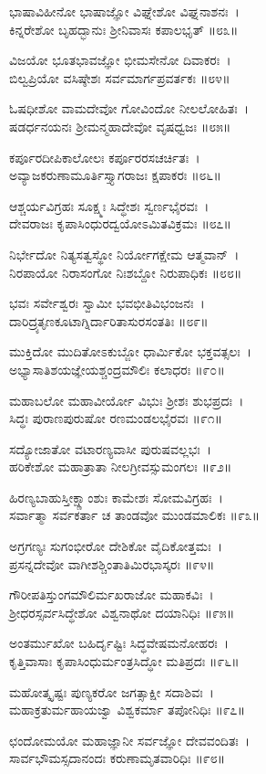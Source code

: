 	ಭಾಷಾವಿಹೀನೋ ಭಾಷಾಜ್ಞೋ ವಿಘ್ನೇಶೋ ವಿಘ್ನನಾಶನಃ~।\\
	ಕಿನ್ನರೇಶೋ ಬೃಹದ್ಭಾನುಃ ಶ್ರೀನಿವಾಸಃ ಕಪಾಲಭೃತ್ ॥೮೩॥

ವಿಜಯೋ ಭೂತಭಾವಜ್ಞೋ ಭೀಮಸೇನೋ ದಿವಾಕರಃ~।\\
ಬಿಲ್ವಪ್ರಿಯೋ ವಸಿಷ್ಠೇಶಃ ಸರ್ವಮಾರ್ಗಪ್ರವರ್ತಕಃ ॥೮೪॥

	ಓಷಧೀಶೋ ವಾಮದೇವೋ ಗೋವಿಂದೋ ನೀಲಲೋಹಿತಃ~।\\
	ಷಡರ್ಧನಯನಃ ಶ್ರೀಮನ್ಮಹಾದೇವೋ ವೃಷಧ್ವಜಃ ॥೮೫॥

ಕರ್ಪೂರದೀಪಿಕಾಲೋಲಃ ಕರ್ಪೂರರಸಚರ್ಚಿತಃ~।\\
ಅವ್ಯಾಜಕರುಣಾಮೂರ್ತಿಸ್ತ್ಯಾಗರಾಜಃ ಕ್ಷಪಾಕರಃ ॥೮೬॥

	ಆಶ್ಚರ್ಯವಿಗ್ರಹಃ ಸೂಕ್ಷ್ಮಃ ಸಿದ್ಧೇಶಃ ಸ್ವರ್ಣಭೈರವಃ~।\\
	ದೇವರಾಜಃ ಕೃಪಾಸಿಂಧುರದ್ವಯೋಽಮಿತವಿಕ್ರಮಃ ॥೮೭॥

ನಿರ್ಭೇದೋ ನಿತ್ಯಸತ್ವಸ್ಥೋ ನಿರ್ಯೋಗಕ್ಷೇಮ ಆತ್ಮವಾನ್~।\\
ನಿರಪಾಯೋ ನಿರಾಸಂಗೋ ನಿಃಶಬ್ದೋ ನಿರುಪಾಧಿಕಃ ॥೮೮॥

	ಭವಃ ಸರ್ವೇಶ್ವರಃ ಸ್ವಾಮೀ ಭವಭೀತಿವಿಭಂಜನಃ~।\\
	ದಾರಿದ್ರ್ಯತೃಣಕೂಟಾಗ್ನಿರ್ದಾರಿತಾಸುರಸಂತತಿಃ ॥೮೯॥

ಮುಕ್ತಿದೋ ಮುದಿತೋಽಕುಬ್ಜೋ ಧಾರ್ಮಿಕೋ ಭಕ್ತವತ್ಸಲಃ~।\\
ಅಭ್ಯಾಸಾತಿಶಯಜ್ಞೇಯಶ್ಚಂದ್ರಮೌಲಿಃ ಕಲಾಧರಃ ॥೯೦॥

	ಮಹಾಬಲೋ ಮಹಾವೀರ್ಯೋ ವಿಭುಃ ಶ್ರೀಶಃ ಶುಭಪ್ರದಃ~।\\
	ಸಿದ್ಧಃ ಪುರಾಣಪುರುಷೋ ರಣಮಂಡಲಭೈರವಃ ॥೯೧॥

ಸದ್ಯೋಜಾತೋ ವಟಾರಣ್ಯವಾಸೀ ಪುರುಷವಲ್ಲಭಃ~।\\
ಹರಿಕೇಶೋ ಮಹಾತ್ರಾತಾ ನೀಲಗ್ರೀವಸ್ಸುಮಂಗಲಃ ॥೯೨॥

	ಹಿರಣ್ಯಬಾಹುಸ್ತೀಕ್ಷ್ಣಾಂಶುಃ ಕಾಮೇಶಃ ಸೋಮವಿಗ್ರಹಃ~।\\
	ಸರ್ವಾತ್ಮಾ ಸರ್ವಕರ್ತಾ ಚ ತಾಂಡವೋ ಮುಂಡಮಾಲಿಕಃ ॥೯೩॥

ಅಗ್ರಗಣ್ಯಃ ಸುಗಂಭೀರೋ ದೇಶಿಕೋ ವೈದಿಕೋತ್ತಮಃ~।\\
ಪ್ರಸನ್ನದೇವೋ ವಾಗೀಶಶ್ಚಿಂತಾತಿಮಿರಭಾಸ್ಕರಃ ॥೯೪॥

	ಗೌರೀಪತಿಸ್ತುಂಗಮೌಲಿರ್ಮಖರಾಜೋ ಮಹಾಕವಿಃ~।\\
	ಶ್ರೀಧರಸ್ಸರ್ವಸಿದ್ಧೇಶೋ ವಿಶ್ವನಾಥೋ ದಯಾನಿಧಿಃ ॥೯೫॥

ಅಂತರ್ಮುಖೋ ಬಹಿರ್ದೃಷ್ಟಿಃ ಸಿದ್ಧವೇಷಮನೋಹರಃ~।\\
ಕೃತ್ತಿವಾಸಾಃ ಕೃಪಾಸಿಂಧುರ್ಮಂತ್ರಸಿದ್ಧೋ ಮತಿಪ್ರದಃ ॥೯೬॥

	ಮಹೋತ್ಕೃಷ್ಟಃ ಪುಣ್ಯಕರೋ ಜಗತ್ಸಾಕ್ಷೀ ಸದಾಶಿವಃ~।\\
	ಮಹಾಕ್ರತುರ್ಮಹಾಯಜ್ವಾ ವಿಶ್ವಕರ್ಮಾ ತಪೋನಿಧಿಃ ॥೯೭॥

ಛಂದೋಮಯೋ ಮಹಾಜ್ಞಾನೀ ಸರ್ವಜ್ಞೋ ದೇವವಂದಿತಃ~।\\
ಸಾರ್ವಭೌಮಸ್ಸದಾನಂದಃ ಕರುಣಾಮೃತವಾರಿಧಿಃ ॥೯೮॥

